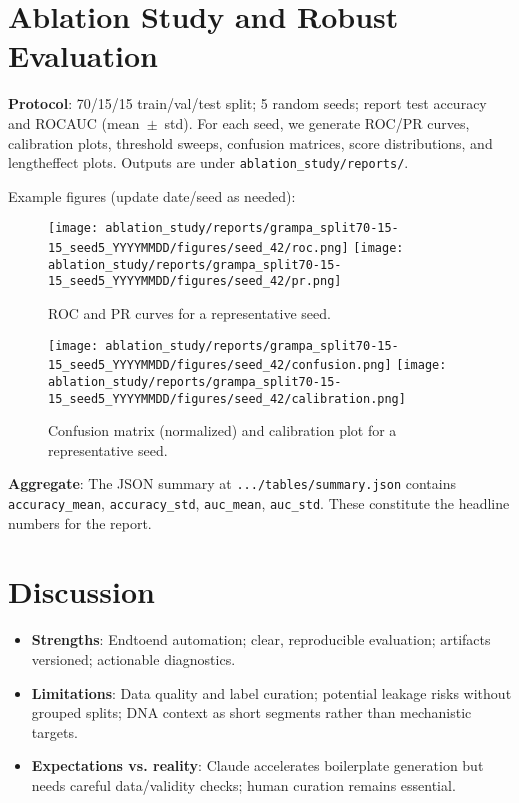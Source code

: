 \documentclass{article}
\begin{document}
\section{Ablation Study and Robust Evaluation}
\textbf{Protocol}: 70/15/15 train/val/test split; 5 random seeds; report test accuracy and ROC\-AUC (mean~$\pm$~std). For each seed, we generate ROC/PR curves, calibration plots, threshold sweeps, confusion matrices, score distributions, and length\-effect plots. Outputs are under \texttt{ablation\_study/reports/}.

\noindent Example figures (update date/seed as needed):
\begin{figure}[h]
  \centering
  \texttt{[image: ablation\_study/reports/grampa\_split70-15-15\_seed5\_YYYYMMDD/figures/seed\_42/roc.png]}
  \texttt{[image: ablation\_study/reports/grampa\_split70-15-15\_seed5\_YYYYMMDD/figures/seed\_42/pr.png]}
  \caption{ROC and PR curves for a representative seed.}
\end{figure}

\begin{figure}[h]
  \centering
  \texttt{[image: ablation\_study/reports/grampa\_split70-15-15\_seed5\_YYYYMMDD/figures/seed\_42/confusion.png]}
  \texttt{[image: ablation\_study/reports/grampa\_split70-15-15\_seed5\_YYYYMMDD/figures/seed\_42/calibration.png]}
  \caption{Confusion matrix (normalized) and calibration plot for a representative seed.}
\end{figure}

\noindent \textbf{Aggregate}: The JSON summary at \texttt{.../tables/summary.json} contains \texttt{accuracy\_mean}, \texttt{accuracy\_std}, \texttt{auc\_mean}, \texttt{auc\_std}. These constitute the headline numbers for the report.

\section{Discussion}
\begin{itemize}[leftmargin=*,nosep]
  \item \textbf{Strengths}: End\-to\-end automation; clear, reproducible evaluation; artifacts versioned; actionable diagnostics.
  \item \textbf{Limitations}: Data quality and label curation; potential leakage risks without grouped splits; DNA context as short segments rather than mechanistic targets.
  \item \textbf{Expectations vs. reality}: Claude accelerates boilerplate generation but needs careful data/validity checks; human curation remains essential.
\end{itemize}
\end{document}
